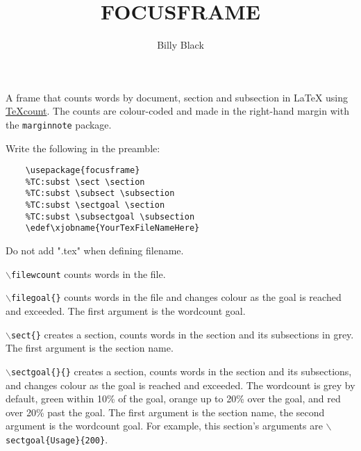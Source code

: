 \documentclass{article}
\title{FOCUSFRAME}
\author{Billy Black}
\edef\xjobname{README}
\begin{document}
\maketitle

{}

A frame that counts words by document, section and subsection in LaTeX using \href{https://app.uio.no/ifi/texcount/}{TeXcount}. The counts are colour-coded and made in the right-hand margin with the \texttt{marginnote} package.


Write the following in the preamble: 

\begin{verbatim}
    \usepackage{focusframe}
    %TC:subst \sect \section
    %TC:subst \subsect \subsection
    %TC:subst \sectgoal \section
    %TC:subst \subsectgoal \subsection
    \edef\xjobname{YourTexFileNameHere}
\end{verbatim}

Do not add ".tex" when defining filename.

\texttt{$\backslash$filewcount} counts words in the file.

\texttt{$\backslash$filegoal\{\}} counts words in the file and changes colour as the goal is reached and exceeded. The first argument is the wordcount goal.

\texttt{$\backslash$sect\{\}} creates a section, counts words in the section and its subsections in grey. The first argument is the section name.

\texttt{$\backslash$sectgoal\{\}\{\}} creates a section, counts words in the section and its subsections, and changes colour as the goal is reached and exceeded. The wordcount is grey by default, green within 10\% of the goal, orange up to 20\% over the goal, and red over 20\% past the goal. The first argument is the section name, the second argument is the wordcount goal. For example, this section's arguments are \texttt{$\backslash$sectgoal\{Usage\}\{200\}}.
\end{document}
